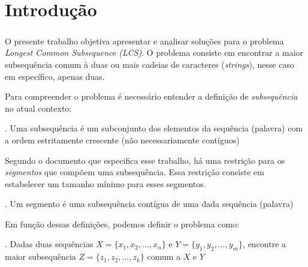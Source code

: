 \chapter{Introdução}

\paragraph*{}

O presente trabalho objetiva apresentar e analisar soluções para
o problema {\it Longest Common Subsequence (LCS)}. O problema 
consiste em encontrar a maior subsequência comum à duas ou 
mais cadeias de caracteres ({\it strings}), nesse caso em 
específico, apenas duas.

Para compreender o problema é necessário entender a definição
de \emph{ subsequência} no atual contexto:

. Uma subsequência é um subconjunto dos elementos da sequência (palavra)
com a ordem estritamente crescente (não necessariamente contíguos)

Segundo o documento que especifica esse trabalho, há uma restrição para os
\emph{segmentos} que compõem uma subsequência. Essa restrição consiste em 
estabelecer um tamanho mínimo para esses segmentos.

. Um segmento é uma subsequência contígua de uma dada sequência (palavra)

Em função dessas definições, podemos definir o problema como:

. Dadas duas sequências $X=\{x_1, x_2, ..., x_n\}$ e 
$Y=\{y_1, y_2, ..., y_m\}$, encontre a maior subsequência 
$Z=\{z_1, z_2, ..., z_k\}$ comum a $X$ e $Y$
